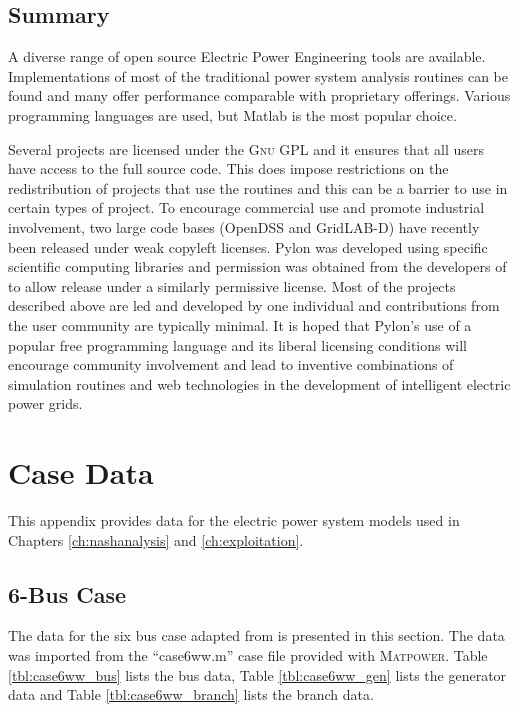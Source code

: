 \section*{Summary}
A diverse range of open source Electric Power Engineering tools are available.
Implementations of most of the traditional power system analysis routines can be
found and many offer performance comparable with proprietary offerings.  Various
programming languages are used, but Matlab is the most popular choice.

Several projects are licensed under the \textsc{Gnu} GPL and it ensures that all
users have access to the full source code.  This does impose restrictions on the
redistribution of projects that use the routines and this can be a barrier to
use in certain types of project.  To encourage commercial use and promote
industrial involvement, two large code bases (OpenDSS and GridLAB-D) have
recently been released under weak copyleft licenses.  Pylon was developed using
specific scientific computing libraries and permission was obtained from the
developers of \matpower to allow release under a similarly permissive license.
Most of the projects described above are led and developed by one individual
and contributions from the user community are typically minimal.  It is hoped
that Pylon's use of a popular free programming language and its liberal
licensing conditions will encourage community involvement and lead to inventive
combinations of simulation routines and web technologies in the
development of intelligent electric power grids.

\chapter{Case Data}
This appendix provides data for the electric power system models used in
Chapters \ref{ch:nashanalysis} and \ref{ch:exploitation}.

\section{6-Bus Case}
\label{adx:case6ww}
The data for the six bus case adapted from  is presented in this section.  The data was imported from the
``case6ww.m'' case file provided with \textsc{Matpower}.
Table \ref{tbl:case6ww_bus} lists the bus data, Table \ref{tbl:case6ww_gen}
lists the generator data and Table \ref{tbl:case6ww_branch} lists the branch
data.

